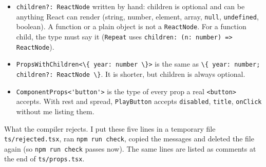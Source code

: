 \documentclass[
]{article}
\newcommand{\passthrough}[1]{#1}
\providecommand{\tightlist}{%
  \setlength{\itemsep}{0pt}\setlength{\parskip}{0pt}}
\begin{document}
\begin{itemize}
\tightlist
\item
  \passthrough{\lstinline!children?: ReactNode!} written by hand:
  children is optional and can be anything React can render (string,
  number, element, array, \passthrough{\lstinline!null!},
  \passthrough{\lstinline!undefined!}, boolean). A function or a plain
  object is not a \passthrough{\lstinline!ReactNode!}. For a function
  child, the type must say it (\passthrough{\lstinline!Repeat!} uses
  \passthrough{\lstinline!children: (n: number) => ReactNode!}).
\item
  \passthrough{\lstinline!PropsWithChildren<\{ year: number \}>!} is the
  same as
  \passthrough{\lstinline!\{ year: number; children?: ReactNode \}!}. It
  is shorter, but children is always optional.
\item
  \passthrough{\lstinline!ComponentProps<'button'>!} is the type of
  every prop a real \passthrough{\lstinline!<button>!} accepts. With
  rest and spread, \passthrough{\lstinline!PlayButton!} accepts
  \passthrough{\lstinline!disabled!}, \passthrough{\lstinline!title!},
  \passthrough{\lstinline!onClick!} without me listing them.
\end{itemize}

What the compiler rejects. I put these five lines in a temporary file
\passthrough{\lstinline!ts/rejected.tsx!}, ran
\passthrough{\lstinline!npm run check!}, copied the messages and deleted
the file again (so \passthrough{\lstinline!npm run check!} passes now).
The same lines are listed as comments at the end of
\passthrough{\lstinline!ts/props.tsx!}.
\end{document}
